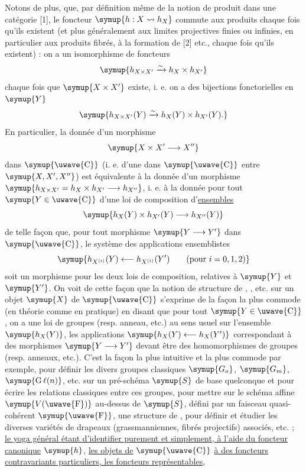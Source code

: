 Notons de plus, que, par définition même de la notion de produit dans une
catégorie [1], le foncteur $\symup{h:X\rightsquigarrow h_X}$ commute aux produits chaque
fois qu'ils existent (et plus généralement aux limites projectives finies ou
infinies, en particulier aux produits fibrés, à la formation de  [2]
etc., chaque fois qu'ils existent) : on a un isomorphisme de foncteurs
\[
  \symup{h_{X\times X'}\xrightarrow{\sim}h_X\times h_{X'}}
\]
chaque fois que $\symup{X\times X'}$ existe, i. e. on a des bijections fonctorielles en
$\symup{Y}$
\[
  \symup{h_{X\times X'}(Y)\xrightarrow{\sim}h_X(Y)\times h_{X'}(Y).}
\]
En particulier, la donnée d'un morphisme
\[
  \symup{X\times X'\longrightarrow X''}
\]
dans $\symup{\text{\uwave{C}}}$ (i. e. d'une  dans $\symup{\text{\uwave{C}}}$ entre
$\symup{X,X',X''}$) est équivalente à la donnée d'un morphisme
$\symup{h_{X\times X'}=h_X\times h_{X'}\longrightarrow h_{X''}}$,
i. e. à la donnée pour tout $\symup{Y\in\text{\uwave{C}}}$ d'une loi de composition d'\uline{ensembles}
\[
  \symup{h_X(Y)\times h_{X'}(Y)\longrightarrow h_{X''}(Y)}
\]
de telle façon que, pour tout morphisme $\symup{Y\longrightarrow Y'}$ dans
$\symup{\text{\uwave{C}}}$, le système des applications ensemblistes
\[
  \symup{h_{X^{(i)}}(Y)\longleftarrow h_{X^{(i)}}(Y')
  \qquad(\text{pour }i=0,1,2)}
\]
soit un morphisme pour les deux lois de composition, relatives à $\symup{Y}$ et $\symup{Y'}$.
On voit de cette façon que la notion de structure de ,
, etc. sur un objet $\symup{X}$ de $\symup{\text{\uwave{C}}}$ s'exprime de la
façon la plus commode (en théorie comme en pratique) en disant que pour tout
$\symup{Y\in\text{\uwave{C}}}$, on a une loi de groupes (resp. anneau, etc.) au sens usuel
sur l'ensemble $\symup{h_X(Y)}$, les applications
$\symup{h_X(Y)\longleftarrow h_X(Y')}$ correspondant à des morphismes
$\symup{Y\longrightarrow Y'}$ devant être des homomorphismes de groupes (resp.
anneaux, etc.). C'est la façon la plus intuitive et la plus commode par
exemple, pour définir les divers groupes classiques $\symup{G_a}$, $\symup{G_m}$,
$\symup{\operatorname{G}\ell(n)}$, etc. sur un pré-schéma $\symup{S}$ de base quelconque et pour
écrire les relations classiques entre ces groupes, pour mettre sur le schéma
affine $\symup{V(\text{\uwave{F}})}$ au-dessus de $\symup{S}$, défini par un faisceau quasi-cohérent
$\symup{\text{\uwave{F}}}$, une structure de , pour définir et étudier les
diverses variétés de drapeaux (grassmanniennes, fibrés projectifs) associés,
etc. ; \uline{le yoga général étant d'identifier purement et simplement, à l'aide du
foncteur canonique} $\symup{h}$, \uline{les objets de} $\symup{\text{\uwave{C}}}$ \uline{à des foncteurs
contravariants particuliers, les foncteurs représentables},

